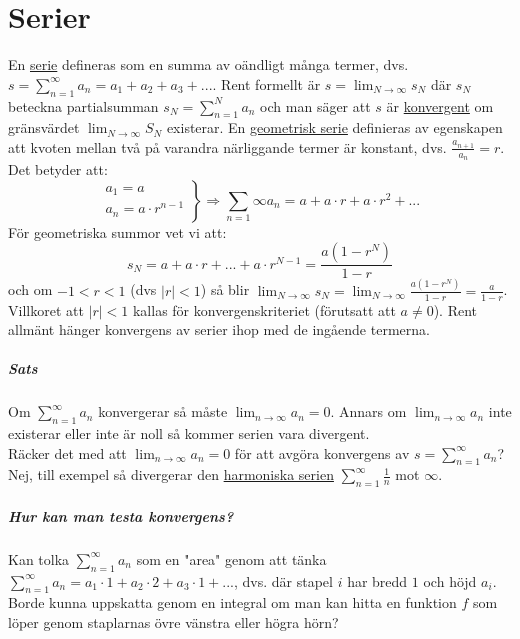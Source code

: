 \chapter{Serier}
En \underline{serie} defineras som en summa av oändligt många termer,
dvs. $s=\sum_{n=1}^\infty a_n=a_1+a_2+a_3+...$.
Rent formellt är $s=\lim_{N\to\infty}s_N$ där $s_N$ beteckna partialsumman $s_N=\sum_{n=1}^N a_n$ och man säger att $s$ är \underline{konvergent} om gränsvärdet $\lim_{N\to\infty}S_N$ existerar.
En \underline{geometrisk serie} definieras av egenskapen att kvoten mellan två på varandra närliggande termer är konstant,
dvs. $\frac{a_{n+1}}{a_n}=r$.
Det betyder att:
\begin{equation*}
    \left.
    \begin{matrix}
        a_1=a \\
        a_n=a\cdot r^{n-1}
    \end{matrix}
    \right\rbrace
    \Rightarrow\sum_{n=1}\infty a_n=a+a\cdot r+a\cdot r^2+...
\end{equation*}
För geometriska summor vet vi att:
\begin{equation*}
    s_N=a+a\cdot r+...+a\cdot r^{N-1}=\frac{a(1-r^N)}{1-r}
\end{equation*}
och om $-1<r<1$ (dvs $|r|<1$) så blir $\lim_{N\to\infty}s_N=\lim_{N\to\infty}\frac{a(1-r^N)}{1-r}=\frac{a}{1-r}$.
Villkoret att $|r|<1$ kallas för konvergenskriteriet (förutsatt att $a\neq 0$).
Rent allmänt hänger konvergens av serier ihop med de ingående termerna.

\paragraph{Sats} Om $\sum_{n=1}^\infty a_n$ konvergerar så måste $\lim_{n\to\infty}a_n=0$.
Annars om $\lim_{n\to\infty}a_n$ inte existerar eller inte är noll så kommer serien vara divergent.
\\
Räcker det med att $\lim_{n\to\infty}a_n=0$ för att avgöra konvergens av $s=\sum_{n=1}^\infty a_n$?
Nej, till exempel så divergerar den \underline{harmoniska serien} $\sum_{n=1}^\infty\frac{1}{n}$ mot $\infty$.
\paragraph*{Hur kan man testa konvergens?}
Kan tolka $\sum_{n=1}^\infty a_n$ som en "area" genom att tänka $\sum_{n=1}^\infty a_n=a_1\cdot 1+a_2\cdot 2+a_3\cdot 1+...$, dvs.
där stapel $i$ har bredd $1$ och höjd $a_i$.
Borde kunna uppskatta genom en integral om man kan hitta en funktion $f$ som löper genom staplarnas övre vänstra eller högra hörn?

